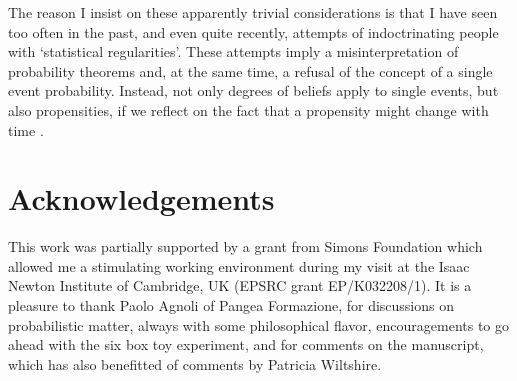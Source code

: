 \documentclass[11pt]{article}
\begin{document}
The reason I insist on these apparently trivial considerations
is that I have seen too often in the past, and even quite recently, 
attempts of indoctrinating people with `statistical regularities'.
These attempts imply a misinterpretation of probability theorems and, 
at the same time, a refusal of the concept 
of a single event probability.
Instead, not only degrees of beliefs apply to single events,
but also propensities, if we reflect on the fact that
a propensity might change with time \cite{ME2016}.

\section*{Acknowledgements}
This work was partially supported by a grant from Simons Foundation
which allowed me a stimulating working environment during
 my visit at the Isaac Newton Institute
of Cambridge, UK (EPSRC grant EP/K032208/1). It is a pleasure
to thank Paolo Agnoli of Pangea Formazione, 
for discussions on probabilistic matter, 
always with some philosophical flavor, encouragements to go 
ahead with the six box toy experiment, 
and for comments  on the manuscript, which 
has also benefitted of comments by Patricia Wiltshire.
\end{document}

